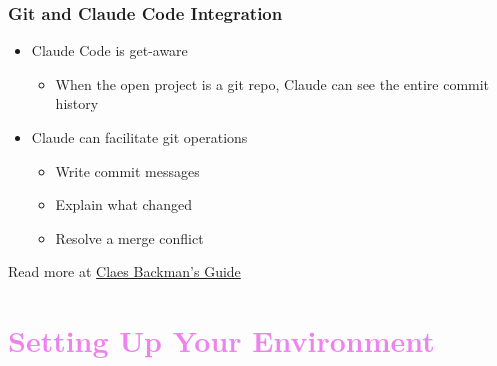 \documentclass[aspectratio=169, 12pt]{beamer}
\begin{document}
\begin{frame}
\frametitle{Git and Claude Code Integration}

\begin{itemize}
    \item Claude Code is get-aware
    \begin{itemize}
        \item When the open project is a git repo, Claude can see the entire commit history
    \end{itemize}\vfill
    \item Claude can facilitate git operations
    \begin{itemize} 
        \item Write commit messages 
        \item Explain what changed 
        \item Resolve a merge conflict 
    \end{itemize}
\end{itemize}
\vfill\footnotesize
Read more at \href{https://claesbackman.com/claude-code-guide.html\#:~:text=VERSION\%20CONTROL-,Git\%20Integration,-Claude\%20Code\%20is}{Claes Backman's Guide}
\end{frame}




\section{\textcolor{violet}{Setting Up Your Environment \vspace{0.3in}}}
\end{document}

